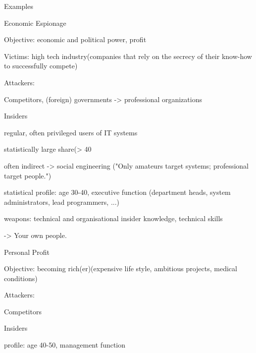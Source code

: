 \documentclass[a4paper]{article}
\begin{document}
\begin{multicols}{3}
    Examples
    \begin{itemize*}
        \item Economic Espionage
        \item Objective: economic and political power, profit
        \item Victims: high tech industry(companies that rely on the secrecy of their know-how to successfully compete)
        \item Attackers:
              \begin{itemize*}
                  \item Competitors, (foreign) governments -> professional organizations
                  \item Insiders
                        \begin{itemize*}
                            \item regular, often privileged users of IT systems
                            \item statistically large share(> 40 %
                            \item often indirect ->  social engineering ("Only amateurs target systems; professional target people.")
                            \item statistical profile: age 30-40, executive function (department heads, system administrators, lead programmers, ...)
                            \item weapons: technical and organisational insider knowledge, technical skills
                            \item -> Your own people.
                        \end{itemize*}
              \end{itemize*}
        \item Personal Profit
              \begin{itemize*}
                  \item Objective: becoming rich(er)(expensive life style, ambitious projects, medical conditions)
                  \item Attackers:
                        \begin{itemize*}
                            \item Competitors
                            \item Insiders
                                  \begin{itemize*}
                                      \item profile: age 40-50, management function

\end{itemize*}
\end{itemize*}
\end{itemize*}
\end{itemize*}
\end{multicols}
\end{document}

